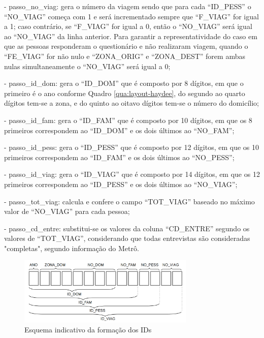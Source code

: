 \begin{compactitem}[]
\item - passo_no_viag: gera o número da viagem sendo que para cada ``ID_PESS'' o ``NO_VIAG'' começa com 1 e será incrementado sempre que ``F_VIAG'' for igual a 1; caso contrário, se ``F_VIAG'' for igual a 0, então o ``NO_VIAG'' será igual ao ``NO_VIAG'' da linha anterior. Para garantir a representatividade do caso em que as pessoas responderam o questionário e não realizaram viagem,   quando o ``FE_VIAG'' for não nulo e ``ZONA_ORIG'' e ``ZONA_DEST'' forem ambas nulas simultaneamente o ``NO_VIAG'' será igual a 0;
\item - passo_id_dom: gera o ``ID_DOM'' que é composto por 8 dígitos, em que o primeiro é o ano conforme Quadro \ref{qua:layout-haydee}, do segundo ao quarto dígitos tem-se a zona, e do quinto ao oitavo dígitos tem-se o número do domicílio;
\item - passo_id_fam: gera o ``ID_FAM'' que é composto por 10 dígitos, em que os 8 primeiros correspondem ao ``ID_DOM'' e os dois últimos ao ``NO_FAM''; 
\item - passo_id_pess: gera o ``ID_PESS'' que é composto por 12 dígitos, em que os 10 primeiros correspondem ao ``ID_FAM'' e os dois últimos ao ``NO_PESS''; 
\item - passo_id_viag: gera o ``ID_VIAG'' que é composto por 14 dígitos, em que os 12 primeiros correspondem ao ``ID_PESS'' e os dois últimos ao ``NO_VIAG'';
\item - passo_tot_viag: calcula e confere o campo ``TOT_VIAG'' baseado no máximo valor de ``NO_VIAG'' para cada pessoa;
\item - passo_cd_entre: substitui-se os valores da coluna “CD_ENTRE” segundo os valores de “TOT_VIAG”, considerando que todas entrevistas são consideradas "completas", segundo informação do Metrô.\\

\begin{figure}[htb]%
    \caption{\label{fig:id-esquema}Esquema indicativo da formação dos IDs}%
    \begin{center}%
        \includegraphics[width=0.75\textwidth]{./imagens/esquema-ID.png}%
    \end{center}%
\end{figure}%


\end{compactitem}
